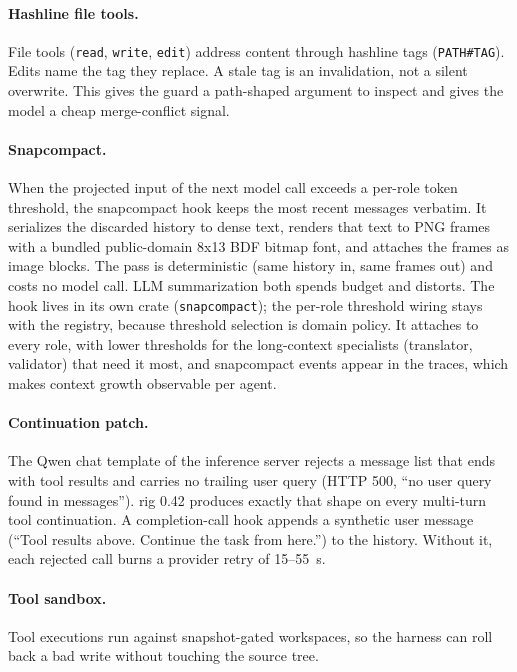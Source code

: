 \documentclass[11pt]{article}
\begin{document}
\paragraph{Hashline file tools.}
File tools (\texttt{read}, \texttt{write}, \texttt{edit}) address content
through hashline tags (\texttt{PATH\#TAG}). Edits name the tag they
replace. A stale tag is an invalidation, not a silent overwrite. This
gives the guard a path-shaped argument to inspect and gives the model a
cheap merge-conflict signal.

\paragraph{Snapcompact.}
When the projected input of the next model call exceeds a per-role token
threshold, the snapcompact hook keeps the most recent messages verbatim.
It serializes the discarded history to dense text, renders that text to
PNG frames with a bundled public-domain 8x13 BDF bitmap font, and
attaches the frames as image blocks. The pass is deterministic (same
history in, same frames out) and costs no model call. LLM summarization
both spends budget and distorts. The hook lives in its own crate
(\texttt{snapcompact}); the per-role threshold wiring stays with the
registry, because threshold selection is domain policy. It attaches to
every role, with lower thresholds for the long-context specialists
(translator, validator) that need it most, and snapcompact events appear
in the traces, which makes context growth observable per agent.

\paragraph{Continuation patch.}
The Qwen chat template of the inference server rejects a message list
that ends
with tool results and carries no trailing user query (HTTP 500, ``no user
query found in messages''). rig 0.42 produces exactly that shape on every
multi-turn tool continuation. A completion-call hook appends a synthetic
user message (``Tool results above. Continue the task from here.'') to
the history. Without it, each rejected call burns a provider retry of
15--55~s.

\paragraph{Tool sandbox.}
Tool executions run against snapshot-gated workspaces, so the harness
can roll back a bad write without touching the source tree.
\end{document}
